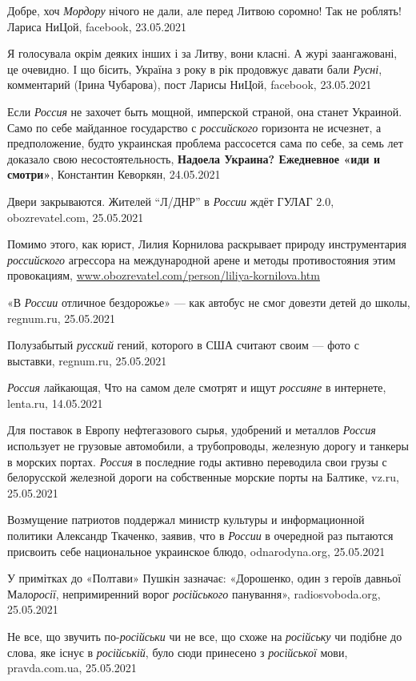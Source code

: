 Добре, хоч \emph{Мордору} нічого не дали, але перед Литвою соромно! Так не
роблять! Лариса НиЦой, facebook, 23.05.2021

Я голосувала окрім деяких інших і за Литву, вони класні. А журі заангажовані,
це очевидно. І що бісить, Україна з року в рік продовжує давати бали
\emph{Русні}, комментарий (Ірина Чубарова), пост Ларисы НиЦой, facebook,
23.05.2021

Если \emph{Россия} не захочет быть мощной, имперской страной, она станет
Украиной. Само по себе майданное государство с \emph{российского} горизонта не
исчезнет, а предположение, будто украинская проблема рассосется сама по себе,
за семь лет доказало свою несостоятельность, \textbf{Надоела Украина? Ежедневное «иди и
смотри»}, Константин Кеворкян, 24.05.2021

Двери закрываются. Жителей \enquote{Л/ДНР} в \emph{России} ждёт ГУЛАГ 2.0,
obozrevatel.com, 25.05.2021

Помимо этого, как юрист, Лилия Корнилова раскрывает природу инструментария
\emph{российского} агрессора на международной арене и методы противостояния
этим провокациям, \url{www.obozrevatel.com/person/liliya-kornilova.htm}

«В \emph{России} отличное бездорожье» — как автобус не смог довезти детей до
школы, regnum.ru, 25.05.2021

Полузабытый \emph{русский} гений, которого в США считают своим — фото с
выставки, regnum.ru, 25.05.2021

\emph{Россия} лайкающая, Что на самом деле смотрят и ищут \emph{россияне} в
интернете, lenta.ru, 14.05.2021

Для поставок в Европу нефтегазового сырья, удобрений и металлов \emph{Россия}
использует не грузовые автомобили, а трубопроводы, железную дорогу и танкеры в
морских портах. \emph{Россия} в последние годы активно переводила свои грузы с
белорусской железной дороги на собственные морские порты на Балтике, vz.ru,
25.05.2021

Возмущение патриотов поддержал министр культуры и информационной политики
Александр Ткаченко, заявив, что в \emph{России} в очередной раз пытаются
присвоить себе национальное украинское блюдо, odnarodyna.org, 25.05.2021

У примітках до «Полтави» Пушкін зазначає: «Дорошенко, один з героїв давньої
Мало\emph{росії}, непримиренний ворог \emph{російського} панування»,
radiosvoboda.org, 25.05.2021

Не все, що звучить по-\emph{російськи} чи не все, що схоже на \emph{російську}
чи подібне до слова, яке існує в \emph{російській}, було сюди принесено з
\emph{російської} мови, pravda.com.ua, 25.05.2021

